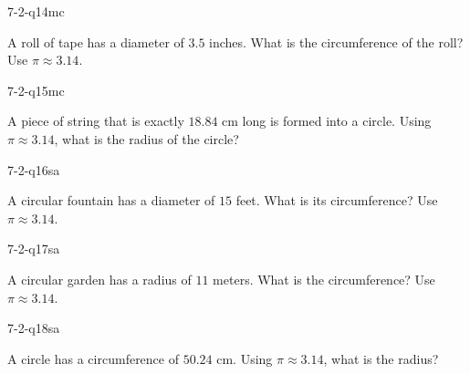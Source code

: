 \begin{practiceQuestion}{7-2-q14}{mc}
\begin{questionText}
A roll of tape has a diameter of $3.5$ inches. What is the circumference of the roll? Use $\pi \approx 3.14$.
\end{questionText}
\end{practiceQuestion}

\begin{practiceQuestion}{7-2-q15}{mc}
\begin{questionText}
A piece of string that is exactly $18.84$ cm long is formed into a circle. Using $\pi \approx 3.14$, what is the radius of the circle?
\end{questionText}
\end{practiceQuestion}


\begin{practiceQuestion}{7-2-q16}{sa}
\begin{questionText}
A circular fountain has a diameter of $15$ feet. What is its circumference? Use $\pi \approx 3.14$.
\end{questionText}
\end{practiceQuestion}

\begin{practiceQuestion}{7-2-q17}{sa}
\begin{questionText}
A circular garden has a radius of $11$ meters. What is the circumference? Use $\pi \approx 3.14$.
\end{questionText}
\end{practiceQuestion}

\begin{practiceQuestion}{7-2-q18}{sa}
\begin{questionText}
A circle has a circumference of $50.24$ cm. Using $\pi \approx 3.14$, what is the radius?
\end{questionText}
\end{practiceQuestion}

